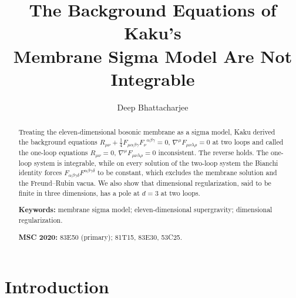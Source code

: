 \documentclass[11pt]{amsart}
\theoremstyle{definition}
\begin{document}
\title[Kaku's membrane field equations]{The Background Equations of Kaku's\\ Membrane Sigma Model Are Not Integrable}

\author{Deep Bhattacharjee}
\address{Formerly, Electro-Gravitational Space Propulsion Laboratory (EGSPL), Bhubaneswar, Odisha 751030, India}
\address{Formerly, University of Calcutta (Heramba Chandra College), 23/49 Gariahat Road, Golpark, Kolkata 700029, West Bengal, India}

\begin{abstract}
Treating the eleven-dimensional bosonic membrane as a sigma model, Kaku derived the background equations $R_{\mu\nu}+\frac14F_{\mu\alpha\beta\gamma}F_\nu{}^{\alpha\beta\gamma}=0$, $\nabla^\mu F_{\mu\nu\lambda\rho}=0$ at two loops and called the one-loop equations $R_{\mu\nu}=0$, $\nabla^\mu F_{\mu\nu\lambda\rho}=0$ inconsistent. The reverse holds. The one-loop system is integrable, while on every solution of the two-loop system the Bianchi identity forces $F_{\alpha\beta\gamma\delta}F^{\alpha\beta\gamma\delta}$ to be constant, which excludes the membrane solution and the Freund--Rubin vacua. We also show that dimensional regularization, said to be finite in three dimensions, has a pole at $d=3$ at two loops.

\medskip\noindent\textbf{Keywords:} membrane sigma model; eleven-dimensional supergravity; dimensional regularization.

\smallskip\noindent\textbf{MSC 2020:} 83E50 (primary); 81T15, 83E30, 53C25.
\end{abstract}

\maketitle

\section{Introduction}\label{sec:intro}
\end{document}
